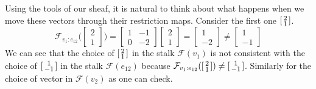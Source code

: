 \documentclass{tufte-handout}
\newcommand{\F}{\mathcal{F}}
\begin{document}
Using the tools of our sheaf, it is natural to think about what happens when we move these vectors through their restriction maps. Consider the first one $\large[ \begin{smallmatrix} 2\\1 \end{smallmatrix}\large]$. 
\[
    \F_{v_1:e_{12}}\Bigg(\begin{bmatrix} 2\\1 \end{bmatrix}\Bigg) = %
    \begin{bmatrix}
        1 & -1 \\
        0 & -2
    \end{bmatrix}%
    \begin{bmatrix}
        2 \\
        1
    \end{bmatrix}=%
    \begin{bmatrix}
        1 \\
        -2
    \end{bmatrix} \neq%
    \begin{bmatrix}
        1 \\
        -1
    \end{bmatrix}    
\]
We can see that the choice of $\large[ \begin{smallmatrix} 2\\1 \end{smallmatrix}\large]$ in the stalk $\F(v_1)$ is not consistent with the choice of $\large[ \begin{smallmatrix} 1\\-1 \end{smallmatrix}\large]$ in the stalk $\F(e_{12})$ because  $\F_{v_1:e_{12}}(\large[ \begin{smallmatrix} 2\\1 \end{smallmatrix}\large]) \neq \large[ \begin{smallmatrix} 1\\-1 \end{smallmatrix}\large]$. Similarly for the choice of vector in $\F(v_2)$ as one can check.
\end{document}
